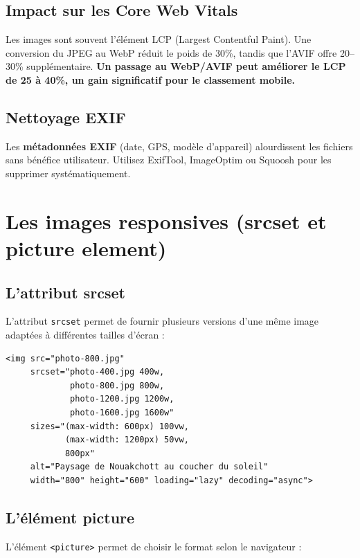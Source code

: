 \documentclass[12pt,a4paper,twoside]{report}
\newcommand{\keyword}[1]{\textbf{\textcolor{googleblue}{#1}}}
\newcommand{\important}[1]{\textbf{\textcolor{googlered}{#1}}}
\begin{document}
\subsection{Impact sur les Core Web Vitals}

Les images sont souvent l'élément LCP (Largest Contentful Paint). Une conversion du JPEG au WebP réduit le poids de 30\%, tandis que l'AVIF offre 20--30\% supplémentaire. \important{Un passage au WebP/AVIF peut améliorer le LCP de 25 à 40\%, un gain significatif pour le classement mobile.}

\subsection{Nettoyage EXIF}

Les \keyword{métadonnées EXIF} (date, GPS, modèle d'appareil) alourdissent les fichiers sans bénéfice utilisateur. Utilisez ExifTool, ImageOptim ou Squoosh pour les supprimer systématiquement.

\section{Les images responsives (srcset et picture element)}

\subsection{L'attribut srcset}

L'attribut \texttt{srcset} permet de fournir plusieurs versions d'une même image adaptées à différentes tailles d'écran :

\begin{lstlisting}[style=htmlcode,caption={Images responsives avec srcset et sizes}]
<img src="photo-800.jpg"
     srcset="photo-400.jpg 400w,
             photo-800.jpg 800w,
             photo-1200.jpg 1200w,
             photo-1600.jpg 1600w"
     sizes="(max-width: 600px) 100vw,
            (max-width: 1200px) 50vw,
            800px"
     alt="Paysage de Nouakchott au coucher du soleil"
     width="800" height="600" loading="lazy" decoding="async">
\end{lstlisting}

\subsection{L'élément picture}

L'élément \texttt{<picture>} permet de choisir le format selon le navigateur :
\end{document}

